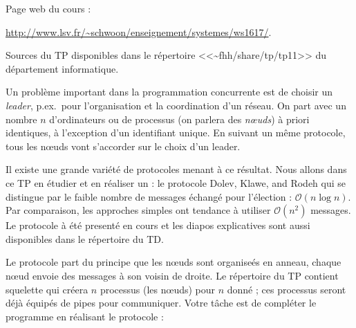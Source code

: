 \documentclass[11pt]{article}
\newcommand{\numtd}{11}
\newcommand{\titretd}{Élection d'un leader}
\begin{document}
\entete{\numtd}{\titretd}

Page web du cours :                                                                                                                                                                                                                                            
\begin{center}
\url{http://www.lsv.fr/~schwoon/enseignement/systemes/ws1617/}.
\end{center}

Sources du TP disponibles dans le répertoire
<<\textasciitilde{}fhh/share/tp/tp11>> du département informatique.

Un problème important dans la programmation concurrente est de choisir un
\emph{leader}, p.ex.\ pour l'organisation et la coordination d'un réseau. On
part avec un nombre $n$ d'ordinateurs ou de processus (on parlera des
\emph{nœuds}) à priori identiques, à l'exception d'un identifiant unique. En
suivant un même protocole, tous les nœuds vont s'accorder sur le choix d'un
leader.

Il existe une grande variété de protocoles menant à ce résultat.  Nous allons
dans ce TP en étudier et en réaliser un : le protocole Dolev, Klawe, and Rodeh
qui se distingue par le faible nombre de messages échangé pour l'élection :
$\mathcal{O}(n\log n)$. Par comparaison, les approches simples ont tendance à
utiliser $\mathcal{O}(n^2)$ messages.  Le protocole à été presenté en cours et
les diapos explicatives sont aussi disponibles dans le répertoire du TD.

Le protocole part du principe que les nœuds sont organiseés en anneau, chaque
nœud envoie des messages à son voisin de droite.  Le répertoire du TP contient
squelette qui créera $n$ processus (les nœuds) pour $n$ donné ; ces processus
seront déjà équipés de pipes pour communiquer. Votre tâche est de compléter le
programme en réalisant le protocole :
\end{document}
